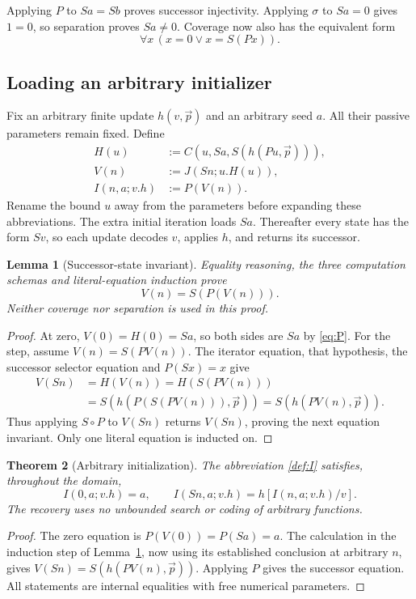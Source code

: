 \documentclass[11pt]{article}
\newtheorem{theorem}{Theorem}[section]
\newtheorem{lemma}[theorem]{Lemma}
\theoremstyle{definition}
\begin{document}
Applying $P$ to $Sa=Sb$ proves successor injectivity.
Applying $\sigma$ to $Sa=0$ gives $1=0$, so separation proves
$Sa\ne0$. Coverage now also has the equivalent form
\[
 \forall x\,(x=0\lor x=S(Px)).\label{eq:predecessor-coverage}
\]

\subsection{Loading an arbitrary initializer}

Fix an arbitrary finite update $h(v,\vec p)$ and an arbitrary seed $a$.
All their passive parameters remain fixed. Define
\begin{align}
 H(u)&:=C(u,Sa,S(h(Pu,\vec p))),\label{def:H}\\
 V(n)&:=J(Sn;u.H(u)),\label{def:V}\\
 I(n,a;v.h)&:=P(V(n)).\label{def:I}
\end{align}
Rename the bound $u$ away from the parameters before expanding these
abbreviations. The extra initial iteration loads $Sa$. Thereafter every
state has the form $Sv$, so each update decodes $v$, applies $h$, and
returns its successor.

\begin{lemma}[Successor-state invariant]
\label{lem:invariant}
Equality reasoning, the three computation schemas and literal-equation
induction prove
\[
 V(n)=S(P(V(n))).\tag{Inv}\label{eq:Inv}
\]
Neither coverage nor separation is used in this proof.
\end{lemma}
\begin{proof}
At zero, $V(0)=H(0)=Sa$, so both sides are $Sa$ by
\eqref{eq:P}. For the step, assume $V(n)=S(PV(n))$. The iterator
equation, that hypothesis, the successor selector equation and
$P(Sx)=x$ give
\begin{align*}
 V(Sn)&=H(V(n))=H(S(PV(n)))\\
      &=S(h(P(S(PV(n))),\vec p))
       =S(h(PV(n),\vec p)).
\end{align*}
Thus applying $S\circ P$ to $V(Sn)$ returns $V(Sn)$, proving the
next equation invariant. Only one literal equation is inducted on.
\end{proof}

\begin{theorem}[Arbitrary initialization]
\label{thm:I}
The abbreviation \eqref{def:I} satisfies, throughout the domain,
\[
 I(0,a;v.h)=a,\qquad
 I(Sn,a;v.h)=h[I(n,a;v.h)/v].
\]
The recovery uses no unbounded search or coding of arbitrary functions.
\end{theorem}
\begin{proof}
The zero equation is $P(V(0))=P(Sa)=a$. The calculation in the
induction step of Lemma~\ref{lem:invariant}, now using its established
conclusion at arbitrary $n$, gives
$V(Sn)=S(h(PV(n),\vec p))$. Applying $P$ gives the successor equation.
All statements are internal equalities with free numerical parameters.
\end{proof}
\end{document}
